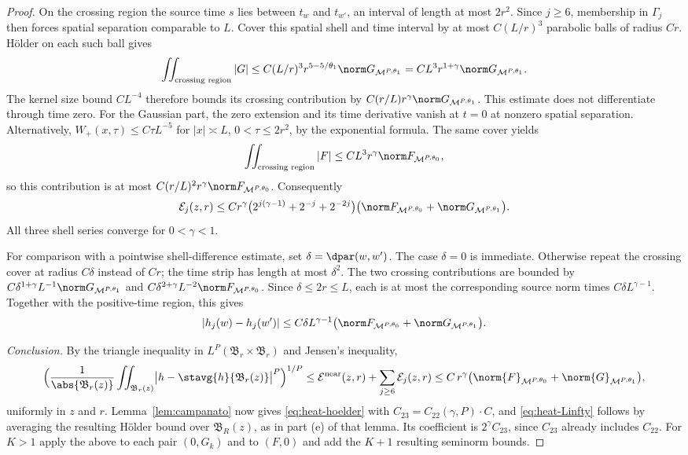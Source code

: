\documentclass[11pt,reqno]{amsart}
\begin{document}
\begin{proof}
On the crossing region the source time $s$ lies between $t_w$ and $t_{w'}$,
an interval of length at most $2r^2$. Since $j\ge6$, membership in
$\Gamma_j$ then forces spatial separation comparable to $L$.
Cover this spatial shell and time interval by at most $C(L/r)^3$
parabolic balls of radius $Cr$. H\"older on each such ball gives
\[
 \iint_{\text{crossing region}}|G|
 \le C(L/r)^3 r^{5-5/\theta_1}
             \norm G_{\mathcal M^{P,\theta_1}}
 = C L^3r^{1+\gamma}\norm G_{\mathcal M^{P,\theta_1}}.
\]
The kernel size bound $CL^{-4}$ therefore bounds its crossing contribution
by $C(r/L)r^\gamma\norm G_{\mathcal M^{P,\theta_1}}$.
This estimate does not differentiate through time zero.
For the Gaussian part, the zero extension and its time derivative vanish
at $t=0$ at nonzero spatial separation. Alternatively,
$W_+(x,\tau)\le C\tau L^{-5}$ for $|x|\asymp L$, $0<\tau\le2r^2$,
by the exponential formula. The same cover yields
\[
 \iint_{\text{crossing region}}|F|
       \le C L^3r^\gamma\norm F_{\mathcal M^{P,\theta_0}},
\]
so this contribution is at most
$C(r/L)^2r^\gamma\norm F_{\mathcal M^{P,\theta_0}}$.
Consequently
\[
 \mathcal E_j(z,r)\le C r^\gamma
       \bigl(2^{j(\gamma-1)}+2^{-j}+2^{-2j}\bigr)
       \bigl(\norm F_{\mathcal M^{P,\theta_0}}
                      +\norm G_{\mathcal M^{P,\theta_1}}\bigr).
\]
All three shell series converge for $0<\gamma<1$.

For comparison with a pointwise shell-difference estimate, set
$\delta=\dpar(w,w')$. The case $\delta=0$ is immediate. Otherwise repeat
the crossing cover at radius $C\delta$ instead of $Cr$; the time strip
has length at most $\delta^2$. The two crossing contributions are bounded by
$C\delta^{1+\gamma}L^{-1}\norm G_{\mathcal M^{P,\theta_1}}$ and
$C\delta^{2+\gamma}L^{-2}\norm F_{\mathcal M^{P,\theta_0}}$.
Since $\delta\le2r\le L$, each is at most the corresponding source norm
times $C\delta L^{\gamma-1}$. Together with the positive-time region,
this gives
\[
 |h_j(w)-h_j(w')|\le C\delta L^{\gamma-1}
    \bigl(\norm F_{\mathcal M^{P,\theta_0}}
                   +\norm G_{\mathcal M^{P,\theta_1}}\bigr).
\]
%
%
%
%
%

\emph{Conclusion.} By the triangle inequality in
$L^{P}(\mathfrak{B}_{r}\times\mathfrak{B}_{r})$ and Jensen's inequality,
\[
  \Bigl(\frac{1}{\abs{\mathfrak{B}_{r}(z)}}\iint_{\mathfrak{B}_{r}(z)}
     \bigl|h-\stavg{h}{\mathfrak{B}_{r}(z)}\bigr|^{P}\Bigr)^{1/P}
  \le\mathcal{E}^{\mathrm{near}}(z,r)+\sum_{j\ge6}\mathcal{E}_{j}(z,r)
  \le C\,r^{\gamma}\bigl(\norm{F}_{\mathcal{M}^{P,\theta_{0}}}
       +\norm{G}_{\mathcal{M}^{P,\theta_{1}}}\bigr),
\]
uniformly in $z$ and $r$. Lemma~\ref{lem:campanato} now gives
\eqref{eq:heat-hoelder} with $C_{23}=C_{22}(\gamma,P)\cdot C$, and
\eqref{eq:heat-Linfty} follows by averaging the resulting H\"older
bound over $\mathfrak B_R(z)$, as in part (e) of that lemma. Its coefficient
is $2^\gamma C_{23}$, since $C_{23}$ already includes $C_{22}$.
For $K>1$ apply the
above to each pair $(0,G_{k})$ and to $(F,0)$ and add the $K+1$ resulting
seminorm bounds.
\end{proof}
\end{document}
